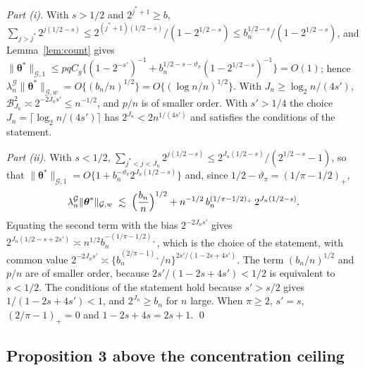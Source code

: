 \documentclass[10pt]{book}
\theoremstyle{definition}
\newcommand{\lev}{j}
\newcommand{\btheta}{\boldsymbol{\theta}}
\newcommand{\thetastar}{\btheta^{*}}
\newcommand{\seff}{s'}
\newcommand{\bn}{b_{n}}
\newcommand{\jst}{j^{*}}
\newcommand{\nGw}[1]{\lVert #1\rVert_{\mathcal{G},w}}
\newcommand{\nGone}[1]{\lVert #1\rVert_{\mathcal{G},1}}
\newcommand{\lamG}{\lambda^{\mathcal{G}}_{n}}
\begin{document}
{\emph{Part (i).} With $s > 1/2$ and $2^{\jst+1} \ge b$,
$\sum_{\lev>\jst}2^{\lev(1/2-s)} \le 2^{(\jst+1)(1/2-s)}/(1-2^{1/2-s}) \le
\bn^{1/2-s}/(1-2^{1/2-s})$, and Lemma~\ref{lem:count} gives
$\nGone{\thetastar} \le pqC_g\{(1-2^{-\seff})^{-1} +
\bn^{1/2-s-\vartheta_{\pi}}(1-2^{1/2-s})^{-1}\} = O(1)$; hence
$\lamG\nGw{\thetastar} = O\{(\bn/n)^{1/2}\} = O\{(\log n/n)^{1/2}\}$. With
$J_n \ge \log_2 n/(4\seff)$, $\mathcal{B}_{J_n}^{2} \asymp 2^{-2J_n\seff} \le
n^{-1/2}$, and $p/n$ is of smaller order. With $\seff > 1/4$ the choice
$J_n = \lceil\log_2 n/(4\seff)\rceil$ has $2^{J_n} < 2n^{1/(4\seff)}$ and
satisfies the conditions of the statement.

\emph{Part (ii).} With $s < 1/2$,
$\sum_{\jst<\lev<J_n}2^{\lev(1/2-s)} \le 2^{J_n(1/2-s)}/(2^{1/2-s}-1)$, so that
$\nGone{\thetastar} = O\{1 + \bn^{-\vartheta_{\pi}}2^{J_n(1/2-s)}\}$ and, since
$1/2 - \vartheta_{\pi} = (1/\pi-1/2)_{+}$,
\[
  \lamG\nGw{\thetastar} \;\lesssim\; \Bigl(\frac{\bn}{n}\Bigr)^{1/2}
  + n^{-1/2}\,\bn^{(1/\pi-1/2)_{+}}\,2^{J_n(1/2-s)} .
\]
Equating the second term with the bias $2^{-2J_n\seff}$ gives
$2^{J_n(1/2-s+2\seff)} \asymp n^{1/2}\bn^{-(1/\pi-1/2)_{+}}$, which is the
choice of the statement, with common value $2^{-2J_n\seff} \asymp
\{\bn^{(2/\pi-1)_{+}}/n\}^{2\seff/(1-2s+4\seff)}$. The term $(\bn/n)^{1/2}$ and
$p/n$ are of smaller order, because $2\seff/(1-2s+4\seff) < 1/2$ is equivalent
to $s < 1/2$. The conditions of the statement hold because $\seff > s/2$ gives
$1/(1-2s+4\seff) < 1$, and $2^{J_n} \ge \bn$ for $n$ large. When $\pi \ge 2$,
$\seff = s$, $(2/\pi-1)_{+} = 0$ and $1-2s+4s = 2s+1$. \qed

\subsection*{Proposition 3 above the concentration ceiling}

}
\end{document}
